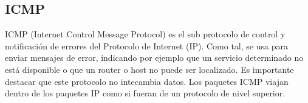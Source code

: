 \documentclass[a4paper,spanish,12pt]{article}
\begin{document}
\subsection{ICMP}
\indent ICMP (Internet Control Message Protocol) es el sub protocolo de control
y notificación de errores del Protocolo de Internet (IP). Como tal, se usa para
enviar mensajes de error, indicando por ejemplo que un servicio determinado no
está disponible o que un router o host no puede ser localizado. Es importante
destacar que este protocolo no intecambia datos. Los paquetes ICMP viajan dentro
de los paquetes IP como si fueran de un protocolo de nivel superior. 



\newpage



 
\end{document}
